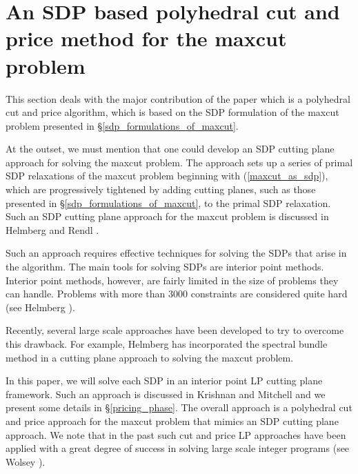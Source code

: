 \documentclass[12pt]{article}
\begin{document}
\section{An SDP based polyhedral cut and price method for the maxcut problem}
\label{maxcut_as_lp} This section deals with the major
contribution of the paper which is a polyhedral cut and price
algorithm, which is based on the SDP formulation of the maxcut
problem presented in \S\ref{sdp_formulations_of_maxcut}.

At the outset, we must mention that one could develop an SDP
cutting plane approach for solving the maxcut problem. The
approach sets up a series of primal SDP relaxations of the maxcut
problem beginning with (\ref{maxcut_as_sdp}), which are
progressively tightened by adding cutting planes, such as those
presented in \S\ref{sdp_formulations_of_maxcut}, to the primal SDP
relaxation. Such an SDP cutting plane approach for the maxcut
problem is discussed in Helmberg and Rendl \cite{helmberg1}.

Such an approach requires effective techniques for solving the
SDPs that arise in the algorithm. The main tools for solving SDPs
are interior point methods. Interior point methods, however, are
fairly limited in the size of problems they can handle. Problems
with more than 3000 constraints are considered quite hard (see
Helmberg \cite{helmberg8}).

Recently, several large scale approaches have been developed to
try to overcome this drawback. For example, Helmberg
\cite{helmberg10} has incorporated the spectral bundle method in a
cutting plane approach to solving the maxcut problem.

In this paper, we will solve each SDP in an interior point LP
cutting plane framework. Such an approach is discussed in Krishnan
and Mitchell \cite{kartik3,kartik2,kartik4,kartik5} and we present
some details in \S\ref{pricing_phase}. The overall approach is a
polyhedral cut and price approach for the maxcut problem that
mimics an SDP cutting plane approach. We note that in the past
such cut and price LP approaches have been applied with a great
degree of success in solving large scale integer programs (see
Wolsey \cite{wolsey}).
\end{document}
